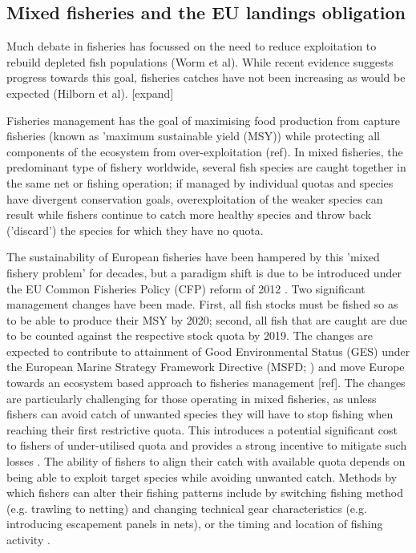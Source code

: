 \documentclass{nature}
\begin{document}
\begin{linenumbers}
\begin{abstract}
[265 words]

\end{abstract}

\section*{}

\subsection{Mixed fisheries and the EU landings obligation} 

Much debate in fisheries has focussed on the need to reduce exploitation to
rebuild depleted fish populations (Worm et al). While recent evidence suggests
progress towards this goal, fisheries catches have not been increasing as would
be expected (Hilborn et al). [expand] 

Fisheries management has the goal of maximising food production from capture
fisheries (known as 'maximum sustainable yield (MSY)) while protecting all
components of the ecosystem from over-exploitation (ref). In mixed fisheries,
the predominant type of fishery worldwide, several fish species are caught
together in the same net or fishing operation; if managed by individual quotas
and species have divergent conservation goals, overexploitation of the weaker
species can result while fishers continue to catch more healthy species and
throw back ('discard') the species for which they have no quota.

The sustainability of European fisheries have been hampered by this 'mixed
fishery problem' for decades, but a paradigm shift is due to be introduced
under the EU Common Fisheries Policy (CFP) reform of 2012
\cite{EuropeanParliamentandCounciloftheEuropeanUnion2013}. Two significant
management changes have been made. First, all fish stocks must be fished so as
to be able to produce their MSY by 2020; second, all fish that are caught are
due to be counted against the respective stock quota by 2019. The changes are
expected to contribute to attainment of Good Environmental Status (GES) under
the European Marine Strategy Framework Directive (MSFD;
\cite{EuropeanParliament2008}) and move Europe towards an ecosystem based
approach to fisheries management [ref]. The changes are particularly
challenging for those operating in mixed fisheries, as unless fishers can avoid
catch of unwanted species they will have to stop fishing when reaching their
first restrictive quota. This introduces a potential significant cost to
fishers of under-utilised quota\cite{Hoff2010a, Ulrich2016} and provides a
strong incentive to mitigate such losses \cite{Condie2013, Condie2013a}. The
ability of fishers to align their catch with available quota depends on being
able to exploit target species while avoiding unwanted catch. Methods by which
fishers can alter their fishing patterns include by switching fishing method
(e.g. trawling to netting) and changing technical gear characteristics (e.g.
introducing escapement panels in nets), or the timing and location of fishing
activity \cite{Fulton2011b, vanPutten2012a}.


\end{linenumbers}
\end{document}
